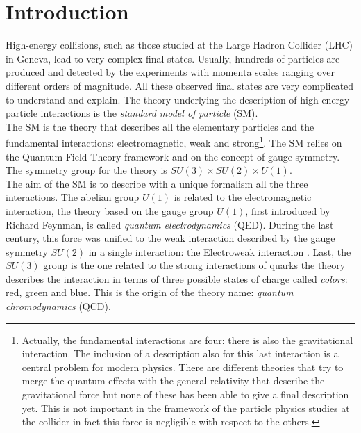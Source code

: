 %
%

\chapter{Introduction}

\setcounter{page}{1}

High-energy collisions, such as those studied at the Large Hadron Collider (LHC) in Geneva, lead to very complex final states. Usually, hundreds of particles are produced and detected by the experiments with momenta scales ranging over different orders of magnitude. All these observed final states are very complicated to understand and explain. The theory underlying the description of high energy particle interactions is the \emph{standard model of particle} (SM). 
\\
The SM is the theory that describes all the elementary particles and the fundamental interactions: electromagnetic, weak and strong\footnote{Actually, the fundamental interactions are four: there is also the gravitational interaction. The inclusion of a description also for this last interaction is a central problem for modern physics. There are different theories that try to merge the quantum effects with the general relativity that describe the gravitational force but none of these has been able to give a final description yet. This is not important in the framework of the particle physics studies at the collider in fact this force is negligible with respect to the others.  }. The SM relies on the Quantum Field Theory framework and on the concept of gauge symmetry. The symmetry group for the theory is $SU(3)\times SU(2)\times U(1)$. 
\\
The aim of the SM is to describe with a unique formalism all the three interactions. The abelian group $U(1)$ is related to the electromagnetic interaction, the theory based on the gauge group $U(1)$, first introduced by Richard Feynman, is called \textit{quantum electrodynamics} (QED). During the last century, this force was unified to the weak interaction described by the gauge symmetry $SU(2)$ in a single interaction: the Electroweak interaction \cite{PhysRevLett.19.1264}. Last, the $SU(3)$ group is the one related to the strong interactions of quarks the theory describes the interaction in terms of three possible states of charge called \textit{colors}: red, green and blue. This is the origin of the theory name: \textit{quantum chromodynamics} (QCD). 

